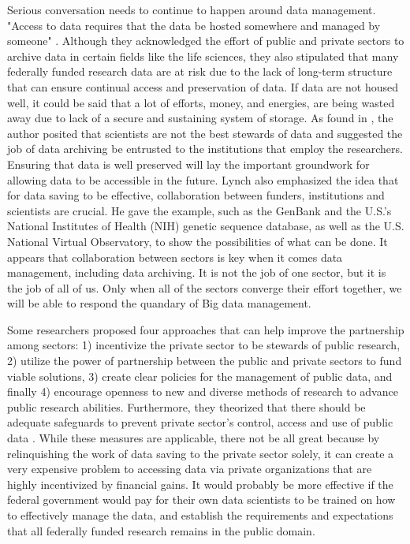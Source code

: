 \documentclass[sigconf]{acmart}
\begin{document}
Serious conversation needs to continue to happen around data management. "Access to data requires that the data be hosted somewhere and managed by someone" \cite{berman2013will}. Although they acknowledged the effort of public and private sectors to archive data in certain fields like the life sciences, they also stipulated that many federally funded research data are at risk due to the lack of long-term structure that can ensure continual access and preservation of data. If data are not housed well, it could be said that a lot of efforts, money, and energies, are being wasted away due to lack of a secure and sustaining system of storage. As found in \cite{lynch2008big}, the author posited that scientists are not the best stewards of data and suggested the job of data archiving be entrusted to the institutions that employ the researchers. Ensuring that data is well preserved will lay the important groundwork for allowing data to be accessible in the future. Lynch also emphasized the idea that for data saving to be effective, collaboration between funders, institutions and scientists are crucial. He gave the example, such as the GenBank and the U.S.'s National Institutes of Health (NIH) genetic sequence database, as well as the U.S. National Virtual Observatory, to show the possibilities of what can be done. It appears that collaboration between sectors is key when it comes data management, including data archiving. It is not the job of one sector, but it is the job of all of us. Only when all of the sectors converge their effort together, we will be able to respond the quandary of Big data management. 

Some researchers proposed four approaches that can help improve the partnership among sectors: 1) incentivize the private sector to be stewards of public research, 2) utilize the power of partnership between the public and private sectors to fund viable solutions, 3) create clear policies for the management of public data, and finally 4) encourage openness to new and diverse methods of research to advance public research abilities. Furthermore, they theorized that there should be adequate safeguards to prevent private sector’s control, access and use of public data \cite{berman2013will} . While these measures are applicable, there not be all great because by relinquishing the work of data saving to the private sector solely, it can create a very expensive problem to accessing data via private organizations that are highly incentivized by financial gains. It would probably be more effective if the federal government would pay for their own data scientists to be trained on how to effectively manage the data, and establish the requirements and expectations that all federally funded research remains in the public domain. 
\end{document}
